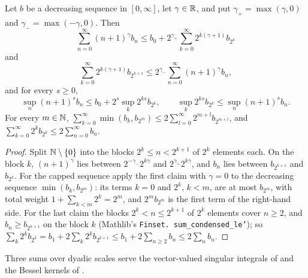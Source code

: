 \begin{lemma}
\label{lem:condensation}
\leanok
{}
Let $b$ be a decreasing sequence in $[0, \infty]$, let $\gamma \in \mathbb{R}$, and put
$\gamma_+ = \max(\gamma, 0)$ and $\gamma_- = \max(-\gamma, 0)$. Then
\[
  \sum_{n=0}^\infty (n+1)^\gamma b_n \leq b_0 + 2^{\gamma_+} \sum_{k=0}^\infty
    2^{k(\gamma+1)} b_{2^k}
\]
and
\[
  \sum_{k=0}^\infty 2^{k(\gamma+1)} b_{2^{k+1}} \leq 2^{\gamma_-} \sum_{n=0}^\infty
    (n+1)^\gamma b_n ,
\]
and for every $s \geq 0$,
\[
  \sup_n (n+1)^s b_n \leq b_0 + 2^s \sup_k 2^{ks} b_{2^k},
  \qquad
  \sup_k 2^{ks} b_{2^k} \leq \sup_n (n+1)^s b_n .
\]
For every $m \in \mathbb{N}$,
$\sum_{k=0}^\infty \min(b_k, b_{2^m}) \leq 2 \sum_{l=0}^\infty 2^{m+l} b_{2^{m+l}}$, and
$\sum_{k=0}^\infty 2^k b_{2^k} \leq 2 \sum_{n=0}^\infty b_n$.
\end{lemma}

\begin{proof}
\leanok
Split $\mathbb{N} \setminus \{0\}$ into the blocks $2^k \leq n < 2^{k+1}$ of $2^k$ elements each. On
the block $k$, $(n+1)^\gamma$ lies between $2^{-\gamma_-} 2^{k\gamma}$ and
$2^{\gamma_+} 2^{k\gamma}$, and $b_n$ lies between $b_{2^{k+1}}$ and $b_{2^k}$. For the
capped sequence apply the first claim with $\gamma = 0$ to the decreasing sequence
$\min(b_k, b_{2^m})$: its terms $k = 0$ and $2^k$, $k < m$, are at most $b_{2^m}$, with total
weight $1 + \sum_{k < m} 2^k = 2^m$, and $2^m b_{2^m}$ is the first term of the right-hand side.
For the last claim the blocks $2^k < n \leq 2^{k+1}$ of $2^k$ elements cover $n \geq 2$, and
$b_n \geq b_{2^{k+1}}$ on the block $k$ (Mathlib's \texttt{Finset.\allowbreak
sum\_\allowbreak condensed\_\allowbreak le'}); so
$\sum_k 2^k b_{2^k} = b_1 + 2 \sum_k 2^k b_{2^{k+1}} \leq b_1 + 2 \sum_{n \geq 2} b_n
\leq 2 \sum_n b_n$.
\end{proof}

Three sums over dyadic scales serve the vector-valued singular integrals of
 and the Bessel kernels of .

